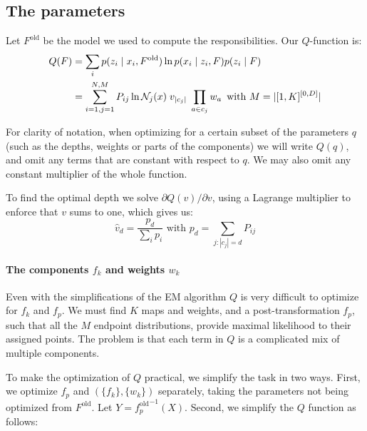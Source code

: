 \documentclass[10pt,a4paper,oneside]{article}
\theoremstyle{definition}
\newcommand{\cN}{{\cal N}}
\theoremstyle{definition}
\begin{document}
\subsection{The parameters}

Let $F^\text{old}$ be the model we used to compute the responsibilities. Our $Q$-function is:
\begin{align*}
Q(F) &= \sum_{i} p(z_i \mid x_i, F^\text{old}) \ln p(x_i \mid z_i, F) p (z_i \mid F) \\
     &= \sum_{i=1,j=1}^{N, M} P_{ij} \ln \cN_j(x) \;v_{|c_j|}\; \prod_{a\in c_j}w_a \,\,\, \text{with } M = |[1,K]^{[0,D]}|
\end{align*}

For clarity of notation, when optimizing for a certain subset of the parameters $q$ (such as the depths, weights or parts of the components) we will write $Q(q)$, and omit any terms that are constant with respect to $q$. We may also omit any constant multiplier of the whole function.

To find the optimal depth we solve $\partial Q(v)/\partial v$, using a Lagrange multiplier to enforce that $v$ sums to one, which gives us:
\[
\hat v_d = \frac{p_d}{\sum_i p_i} \,\,\text{with } p_d = \sum_{j: |c_j| = d} P_{ij}
\]

\paragraph{The components $f_k$ and weights $w_k$}

Even with the simplifications of the EM algorithm $Q$ is very difficult to optimize for $f_k$ and $f_p$. We must find $K$ maps and weights, and a post-transformation $f_p$, such that all the $M$ endpoint distributions, provide maximal likelihood to their assigned points. The problem is that each term in $Q$ is a complicated mix of multiple components.

To make the optimization of $Q$ practical, we simplify the task in two ways. First, we optimize $f_p$ and $(\{f_k\}, \{w_k\})$ separately, taking the parameters not being optimized from $F^\text{old}$. Let $Y = {f_p^\text{old}}^{-1}(X)$. Second, we simplify the $Q$ function as follows: 
\end{document}
